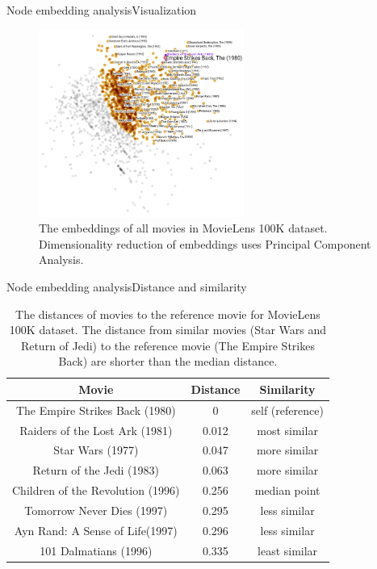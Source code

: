 \documentclass{beamer}
\begin{document}
\begin{frame}{Node embedding analysis}{Visualization}
	\begin{figure}[!ht]\centering
		\includegraphics[width=0.6\textwidth]{movies-annotation}
		\caption{
			The embeddings of all movies in MovieLens 100K dataset. Dimensionality reduction of embeddings uses Principal Component Analysis.
		}
		\label{fig:movies}
	\end{figure}
\end{frame}

\begin{frame}{Node embedding analysis}{Distance and similarity}
	\begin{table}[!ht]\centering
		\caption{
			The distances of movies to the reference movie for MovieLens 100K dataset. The distance from similar movies (Star Wars and Return of Jedi) to the reference movie (The Empire Strikes Back) are shorter than the median distance.
		}
		\begin{tabular}{ccc} \hline
			Movie & Distance & Similarity \\ \hline
			The Empire Strikes Back (1980) & 0 & self (reference) \\ \hline
			Raiders of the Lost Ark (1981) & 0.012 & most similar \\ \hline
			Star Wars (1977) & 0.047 & more similar \\ \hline
			Return of the Jedi (1983) & 0.063 & more similar \\ \hline
			Children of the Revolution (1996) & 0.256 & median point \\ \hline
			Tomorrow Never Dies (1997) & 0.295 & less similar \\ \hline
			Ayn Rand: A Sense of Life(1997) & 0.296 & less similar \\ \hline
			101 Dalmatians (1996) & 0.335 & least similar \\ \hline
		\end{tabular}
		\label{tab:movielens100k-distance}
	\end{table}
\end{frame}
\end{document}
